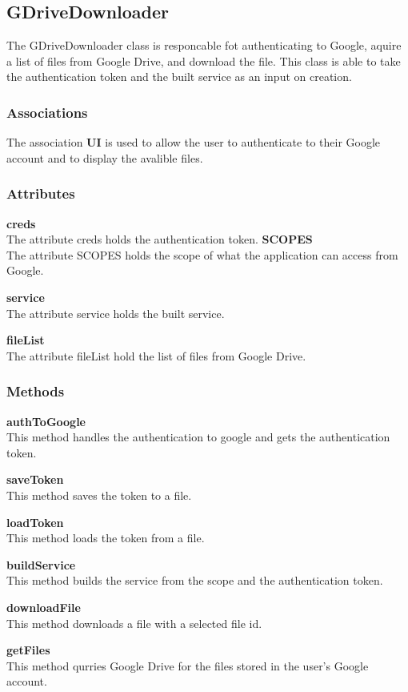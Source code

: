 
\subsection{GDriveDownloader}
The GDriveDownloader class is responcable fot authenticating to Google, aquire a list of files from Google Drive, and download the file.
This class is able to take the authentication token and the built service as an input on creation.  
​
\subsubsection{Associations}
The association \textbf{UI} is used to allow the user to authenticate to their Google account and to display the avalible files.
​
​
\subsubsection{Attributes}
\textbf{creds} \\
The attribute creds holds the authentication token.
​
\textbf{SCOPES} \\
The attribute SCOPES holds the scope of what the application can access from Google.

\textbf{service} \\
The attribute service holds the built service.

\textbf{fileList} \\
The attribute fileList hold the list of files from Google Drive.
​
\subsubsection{Methods}
\textbf{authToGoogle} \\
This method handles the authentication to google and gets the authentication token.

\textbf{saveToken} \\
This method saves the token to a file.

\textbf{loadToken} \\
This method loads the token from a file.

\textbf{buildService} \\
This method builds the service from the scope and the authentication token.

\textbf{downloadFile} \\
This method downloads a file with a selected file id. 

\textbf{getFiles} \\
This method qurries Google Drive for the files stored in the user's Google account. 